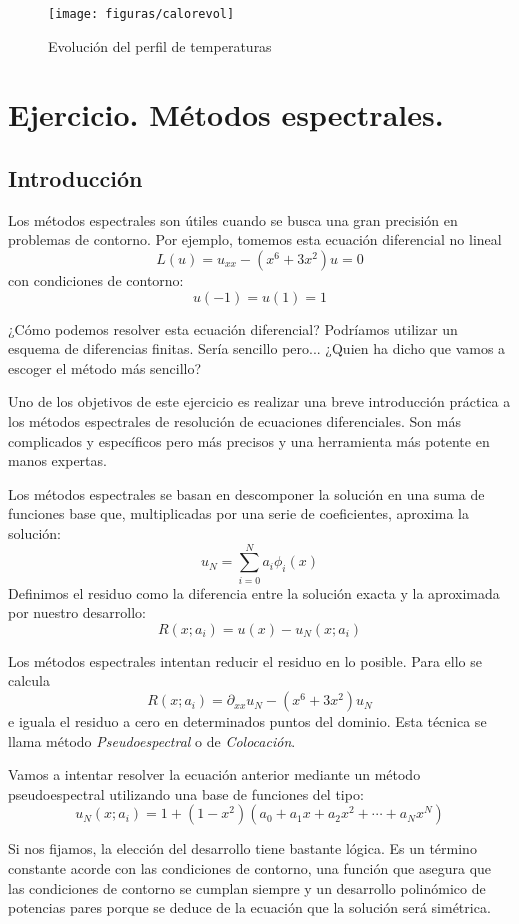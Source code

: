 %
\begin{figure}[H]
  \centering{} \texttt{[image: figuras/calorevol]}


  \caption{Evolución del perfil de temperaturas}
\end{figure}


\section{Ejercicio.  Métodos espectrales.}
\subsection{Introducción}

Los métodos espectrales son útiles cuando se busca una gran precisión
en problemas de contorno. Por ejemplo, tomemos esta ecuación diferencial
no lineal\[
L(u)=u_{xx}-(x^{6}+3x^{2})u=0\]
con condiciones de contorno:\[
u(-1)=u(1)=1\]


¿Cómo podemos resolver esta ecuación diferencial? Podríamos utilizar
un esquema de diferencias finitas. Sería sencillo pero... ¿Quien ha
dicho que vamos a escoger el método más sencillo?

Uno de los objetivos de este ejercicio es realizar una breve introducción
práctica a los métodos espectrales de resolución de ecuaciones diferenciales.
Son más complicados y específicos pero más precisos y una herramienta
más potente en manos expertas.

Los métodos espectrales se basan en descomponer la solución en una
suma de funciones base que, multiplicadas por una serie de coeficientes,
aproxima la solución:\[
u_{N}=\sum_{i=0}^{N}a_{i}\phi_{i}(x)\]
Definimos el residuo como la diferencia entre la solución exacta y
la aproximada por nuestro desarrollo:\[
R(x;a_{i})=u(x)-u_{N}(x;a_{i})\]


Los métodos espectrales intentan reducir el residuo en lo posible.
Para ello se calcula\[
R(x;a_{i})=\partial_{xx}u_{N}-(x^{6}+3x^{2})u_{N}\]
e iguala el residuo a cero en determinados puntos del dominio. Esta
técnica se llama método \emph{Pseudoespectral} o de \emph{Colocación}.

Vamos a intentar resolver la ecuación anterior mediante un método
pseudoespectral utilizando una base de funciones del tipo:\[
u_{N}(x;a_{i})=1+(1-x^{2})(a_{0}+a_{1}x+a_{2}x^{2}+\cdots+a_{N}x^{N})\]


Si nos fijamos, la elección del desarrollo tiene bastante lógica.
Es un término constante acorde con las condiciones de contorno, una
función que asegura que las condiciones de contorno se cumplan siempre
y un desarrollo polinómico de potencias pares porque se deduce de
la ecuación que la solución será simétrica.

